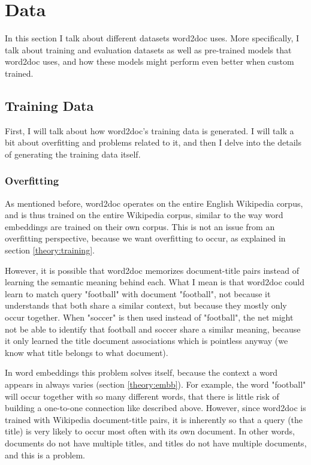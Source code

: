 \chapter{Data}
\label{sec:data}


In this section I talk about different datasets word2doc uses. More specifically, I talk about training and evaluation datasets
as well as pre-trained models that word2doc uses, and how these models might perform even better when custom trained.

\section{Training Data}

First, I will talk about how word2doc's training data is generated. I will talk a bit about overfitting and problems related to
it, and then I delve into the details of generating the training data itself.

\subsection{Overfitting}
\label{data:overfitting}

As mentioned before, word2doc operates on the entire English Wikipedia corpus, and is thus trained on the entire Wikipedia corpus,
similar to the way word embeddings are trained on their own corpus. This is not an issue from an overfitting perspective, because
we want overfitting to occur, as explained in section \ref{theory:training}.

However, it is possible that word2doc memorizes document-title pairs instead of learning the semantic meaning behind each. What I
mean is that word2doc could learn to match query "football" with document "football", not because it understands that
both share a similar context, but because they mostly only occur together. When "soccer" is then used instead of "football", the
net might not be able to identify that football and soccer share a similar meaning, because it only learned the title document
associations which is pointless anyway (we know what title belongs to what document).

In word embeddings this problem solves itself, because the context a word appears in always varies (section \ref{theory:embb}). For
example, the word "football" will occur together with so many different words, that there is little risk of building a one-to-one
connection like described above. However, since word2doc is trained with Wikipedia document-title pairs, it is inherently so that
a query (the title) is very likely to occur most often with its own document. In other words, documents do not have multiple titles,
and titles do not have multiple documents, and this is a problem.

